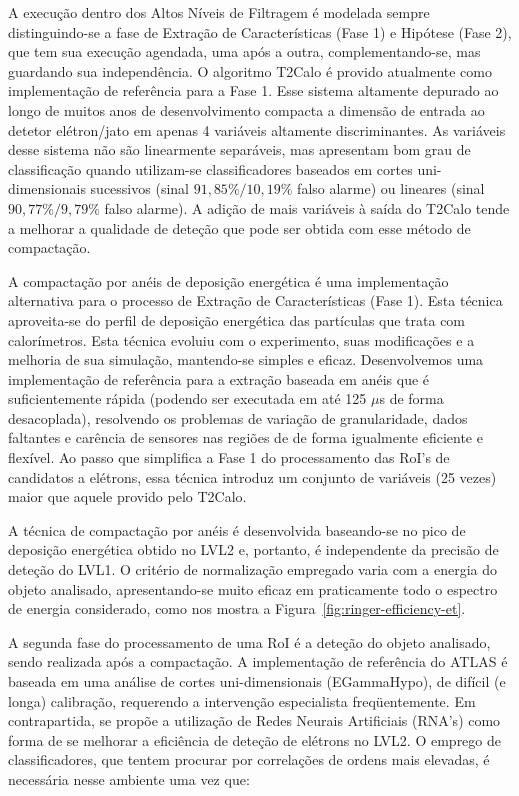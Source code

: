 A execução dentro dos Altos Níveis de Filtragem é modelada sempre
distinguindo-se a fase de Extração de Características (Fase 1) e Hipótese
(Fase 2), que tem sua execução agendada, uma após a outra, complementando-se,
mas guardando sua independência. O algoritmo T2Calo é provido atualmente como
implementação de referência para a Fase 1. Esse sistema altamente depurado ao
longo de muitos anos de desenvolvimento compacta a dimensão de entrada ao
detetor elétron/jato em apenas 4 variáveis altamente discriminantes. As
variáveis desse sistema não são linearmente separáveis, mas apresentam bom
grau de classificação quando utilizam-se classificadores baseados em cortes
uni-dimensionais sucessivos (sinal $91,85\%/10,19\%$ falso alarme) ou lineares
(sinal $90,77\%/9,79\%$ falso alarme). A adição de mais variáveis à saída do
T2Calo tende a melhorar a qualidade de deteção que pode ser obtida com esse
método de compactação.

A compactação por anéis de deposição energética é uma implementação
alternativa para o processo de Extração de Características (Fase 1). Esta
técnica aproveita-se do perfil de deposição energética das partículas que
trata com calorímetros. Esta técnica evoluiu com o experimento, suas
modificações e a melhoria de sua simulação, mantendo-se simples e
eficaz. Desenvolvemos uma implementação de referência para a extração baseada
em anéis que é suficientemente rápida (podendo ser executada em até 125 $\mu$s
de forma desacoplada), resolvendo os problemas de variação de granularidade,
dados faltantes e carência de sensores nas regiões de  de forma
igualmente eficiente e flexível. Ao passo que simplifica a Fase 1 do
processamento das RoI's de candidatos a elétrons, essa técnica introduz um
conjunto de variáveis (25 vezes) maior que aquele provido pelo T2Calo.

A técnica de compactação por anéis é desenvolvida baseando-se no pico de
deposição energética obtido no LVL2 e, portanto, é independente da precisão de
deteção do LVL1. O critério de normalização empregado varia com a energia do
objeto analisado, apresentando-se muito eficaz em praticamente todo o espectro
de energia considerado, como nos mostra a
Figura~\ref{fig:ringer-efficiency-et}.

A segunda fase do processamento de uma RoI é a deteção do objeto analisado,
sendo realizada após a compactação. A implementação de referência do ATLAS é
baseada em uma análise de cortes uni-dimensionais (EGammaHypo), de difícil (e
longa) calibração, requerendo a intervenção especialista freqüentemente. Em
contrapartida, se propõe a utilização de Redes Neurais Artificiais (RNA's)
como forma de se melhorar a eficiência de deteção de elétrons no LVL2. O
emprego de classificadores, que tentem procurar por correlações de ordens mais
elevadas, é necessária nesse ambiente uma vez que:


